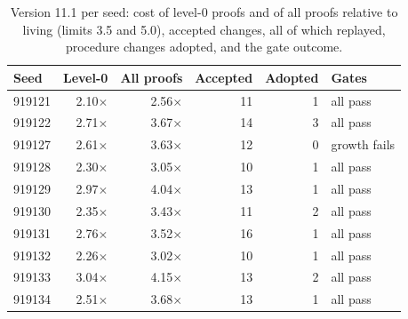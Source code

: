 \begin{table}[t]
\centering
\caption{Version 11.1 per seed: cost of level-0 proofs and of all proofs relative to living (limits 3.5 and 5.0), accepted changes, all of which replayed, procedure changes adopted, and the gate outcome.}
\label{tab:tenseeds}
\small
\begin{tabular}{lrrrrl}
\toprule
Seed & Level-0 & All proofs & Accepted & Adopted & Gates \\
\midrule
919121 & 2.10$\times$ & 2.56$\times$ & 11 & 1 & all pass \\
919122 & 2.71$\times$ & 3.67$\times$ & 14 & 3 & all pass \\
919127 & 2.61$\times$ & 3.63$\times$ & 12 & 0 & growth fails \\
919128 & 2.30$\times$ & 3.05$\times$ & 10 & 1 & all pass \\
919129 & 2.97$\times$ & 4.04$\times$ & 13 & 1 & all pass \\
919130 & 2.35$\times$ & 3.43$\times$ & 11 & 2 & all pass \\
919131 & 2.76$\times$ & 3.52$\times$ & 16 & 1 & all pass \\
919132 & 2.26$\times$ & 3.02$\times$ & 10 & 1 & all pass \\
919133 & 3.04$\times$ & 4.15$\times$ & 13 & 2 & all pass \\
919134 & 2.51$\times$ & 3.68$\times$ & 13 & 1 & all pass \\
\bottomrule
\end{tabular}
\end{table}
